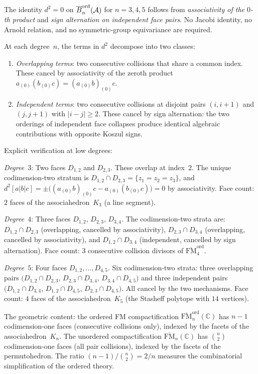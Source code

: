 \begin{proposition}[Ordered AOS relations: $d^2=0$ from
associativity alone; \ClaimStatusProvedHere]
\label{prop:ordered-aos}
The identity $d^2=0$ on
$\overline{B}^{\mathrm{ord}}_n(\mathcal{A})$ for $n=3,4,5$ follows from
\emph{associativity of the $0$-th product} and
\emph{sign alternation on independent face pairs}. No Jacobi
identity, no Arnold relation, and no symmetric-group
equivariance are required.

At each degree~$n$, the terms in $d^2$ decompose into two
classes:
\begin{enumerate}[label=\textup{(\roman*)}]
\item \emph{Overlapping terms}: two consecutive collisions
 that share a common index. These cancel by associativity
 of the zeroth product $a_{(0)}(b_{(0)}c)
 =(a_{(0)}b)_{(0)}c$.
\item \emph{Independent terms}: two consecutive collisions
 at disjoint pairs $(i,i{+}1)$ and $(j,j{+}1)$ with
 $|i-j|\ge 2$. These cancel by sign alternation:
 the two orderings of independent face collapses produce
 identical algebraic contributions with opposite Koszul
 signs.
\end{enumerate}

Explicit verification at low degrees:

\emph{Degree~$3$}: Two faces $D_{1,2}$ and $D_{2,3}$.
These overlap at index~$2$. The unique codimension-two
stratum is $D_{1,2}\cap D_{2,3}=\{z_1{=}z_2{=}z_3\}$,
and $d^2[a|b|c]=\pm\bigl((a_{(0)}b)_{(0)}c
-a_{(0)}(b_{(0)}c)\bigr)=0$ by associativity.
Face count: $2$ faces of the associahedron~$K_3$
(a line segment).

\emph{Degree~$4$}: Three faces $D_{1,2}$, $D_{2,3}$,
$D_{3,4}$. The codimension-two strata are:
$D_{1,2}\cap D_{2,3}$ (overlapping, cancelled by
associativity), $D_{2,3}\cap D_{3,4}$ (overlapping,
cancelled by associativity), and $D_{1,2}\cap D_{3,4}$
(independent, cancelled by sign alternation).
Face count: $3$ consecutive collision divisors of
$\overline{\mathrm{FM}}_4^{\mathrm{ord}}$.

\emph{Degree~$5$}: Four faces $D_{1,2},\ldots,D_{4,5}$.
Six codimension-two strata: three overlapping pairs
$(D_{1,2}\cap D_{2,3}$, $D_{2,3}\cap D_{3,4}$,
$D_{3,4}\cap D_{4,5})$ and three independent pairs
$(D_{1,2}\cap D_{3,4}$, $D_{1,2}\cap D_{4,5}$,
$D_{2,3}\cap D_{4,5})$. All cancel by the two mechanisms.
Face count: $4$ faces of the associahedron~$K_5$
(the Stasheff polytope with $14$ vertices).

The geometric content: the ordered FM compactification
$\overline{\mathrm{FM}}_n^{\mathrm{ord}}(\mathbb C)$
has $n{-}1$ codimension-one faces (consecutive collisions
only), indexed by the facets of the associahedron~$K_n$.
The unordered compactification
$\overline{\mathrm{FM}}_n(\mathbb C)$ has
$\binom{n}{2}$ codimension-one faces (all pair collisions),
indexed by the facets of the permutohedron. The ratio
$(n{-}1)/\binom{n}{2}=2/n$ measures the combinatorial
simplification of the ordered theory.
\end{proposition}

